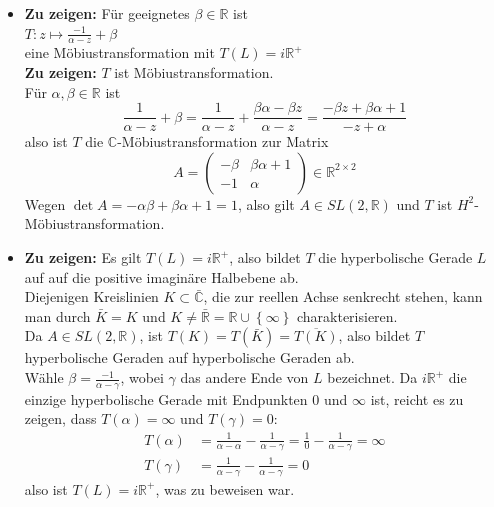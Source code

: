 \begin{solution}
  \begin{itemize}
    \item \textbf{Zu zeigen:} Für geeignetes \( \beta \in \mathbb{R} \) ist \\
    \( T: z \mapsto \frac{-1}{\alpha - z} + \beta \) \\
    eine Möbiustransformation mit \( T(L) = i \mathbb{R}^{+} \) \\
    \textbf{Zu zeigen:} \( T \) ist Möbiustransformation. \\
    Für \( \alpha, \beta \in \mathbb{R} \) ist
    \begin{equation*}
      \frac{1}{\alpha -z} + \beta = \frac{1}{\alpha-z} + \frac{\beta \alpha - \beta z}{\alpha - z} = \frac{-\beta z + \beta \alpha + 1}{-z +\alpha}
    \end{equation*} 
    also ist \( T \) die \( \mathbb{C} \)-Möbiustransformation zur Matrix
    \begin{equation*}
      A = \begin{pmatrix}
        - \beta & \beta \alpha + 1 \\
        - 1 & \alpha 
      \end{pmatrix} \in \mathbb{R}^{2 \times 2}
    \end{equation*}
    Wegen \( \det A = - \alpha \beta + \beta \alpha + 1 = 1 \), also gilt \( A \in SL(2, \mathbb{R}) \) und \( T \) ist \( H^2 \)-Möbiustransformation.
    \item \textbf{Zu zeigen:} Es gilt \( T(L) = i \mathbb{R}^{+} \), also bildet \( T \) die hyperbolische Gerade \( L \) auf auf die positive imaginäre Halbebene ab. \\
    Diejenigen Kreislinien \( K \subset \bar{\mathbb{C}} \), die zur reellen Achse senkrecht stehen, kann man durch \( \bar{K} = K \) und \( K \neq \bar{\mathbb{R}} = \mathbb{R} \cup \left \{ \infty \right \} \) charakterisieren. \\
    Da \( A \in SL(2, \mathbb{R}) \), ist \( T(K) = T(\bar{K}) = \overline{T(K)} \), also bildet \( T \) hyperbolische Geraden auf hyperbolische Geraden ab. \\
    Wähle \( \beta = \frac{-1}{\alpha - \gamma} \), wobei \( \gamma \) das andere Ende von \( L \) bezeichnet. Da \( i \mathbb{R}^{+} \) die einzige hyperbolische Gerade mit Endpunkten \( 0 \) und \( \infty \) ist, reicht es zu zeigen, dass \( T(\alpha) = \infty \) und \( T(\gamma) = 0 \): \\
    \begin{align*}
      T(\alpha) &= \frac{1}{\alpha - \alpha} - \frac{1}{\alpha - \gamma} = \frac{1}{0} - \frac{1}{\alpha - \gamma} = \infty \\
      T(\gamma) &= \frac{1}{\alpha - \gamma} - \frac{1}{\alpha - \gamma} = 0 
    \end{align*}
    also ist \( T(L) = i \mathbb{R}^{+} \), was zu beweisen war.
  \end{itemize}
\end{solution}

